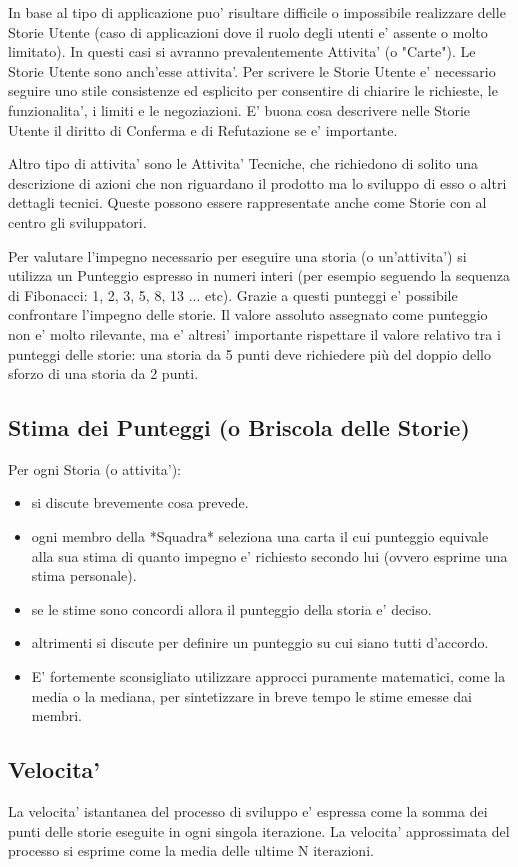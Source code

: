 In base al tipo di applicazione puo' risultare difficile o impossibile realizzare delle Storie Utente (caso di applicazioni dove il ruolo degli utenti e' assente o molto limitato).
In questi casi si avranno prevalentemente Attivita' (o "Carte"). Le Storie Utente sono anch'esse attivita'.
Per scrivere le Storie Utente e' necessario seguire uno stile consistenze ed esplicito per consentire di chiarire le richieste, le funzionalita', i limiti e le negoziazioni.
E' buona cosa descrivere nelle Storie Utente il diritto di Conferma e di Refutazione se e' importante.

Altro tipo di attivita' sono le Attivita' Tecniche, che richiedono di solito una descrizione di azioni che non riguardano il prodotto ma lo sviluppo di esso o altri dettagli tecnici.
Queste possono essere rappresentate anche come Storie con al centro gli sviluppatori.

Per valutare l'impegno necessario per eseguire una storia (o un'attivita') si utilizza un Punteggio espresso in numeri interi (per esempio seguendo la sequenza di Fibonacci: 1, 2, 3, 5, 8, 13 ... etc).
Grazie a questi punteggi e' possibile confrontare l'impegno delle storie. Il valore assoluto assegnato come punteggio non e' molto rilevante, ma e' altresi' importante rispettare il valore relativo tra i punteggi delle storie: una storia da 5 punti deve richiedere più del doppio dello sforzo di una storia da 2 punti.

\subsection{Stima dei Punteggi (o Briscola delle Storie)}


Per ogni Storia (o attivita'):
\begin{itemize}
  \item si discute brevemente cosa prevede.
  \item ogni membro della *Squadra* seleziona una carta il cui punteggio equivale alla sua stima di quanto impegno e' richiesto secondo lui (ovvero esprime una stima personale).
  \item se le stime sono concordi allora il punteggio della storia e' deciso.
  \item altrimenti si discute per definire un punteggio su cui siano tutti d'accordo.
  \item E' fortemente sconsigliato utilizzare approcci puramente matematici, come la media o la mediana, per sintetizzare in breve tempo le stime emesse dai membri.
\end{itemize}

\subsection{Velocita'}

La velocita' istantanea del processo di sviluppo e' espressa come la somma dei punti delle storie eseguite in ogni singola iterazione.
La velocita' approssimata del processo si esprime come la media delle ultime N iterazioni.
